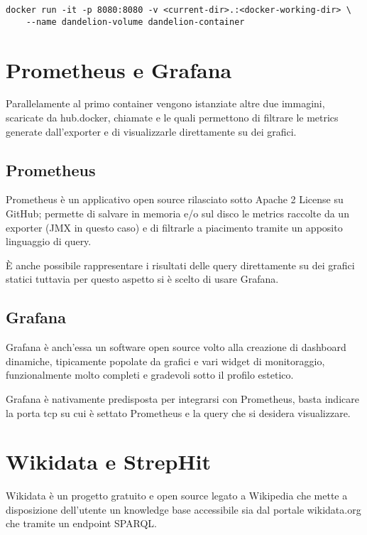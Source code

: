 \begin{lstlisting}[style=YmlStyle, caption=Run Docker]
    docker run -it -p 8080:8080 -v <current-dir>.:<docker-working-dir> \
    --name dandelion-volume dandelion-container
\end{lstlisting}

\section{Prometheus e Grafana}
Parallelamente al primo container vengono istanziate altre due immagini, scaricate da hub.docker\cite{hub-docker}, chiamate \cite{docker-prometheus} 
e \code{grafana/grafana}\cite{docker-grafana} le quali permettono di filtrare le metrics generate dall'exporter e di visualizzarle direttamente su dei grafici. 

\subsection{Prometheus}
Prometheus\cite{prometheus} è un applicativo open source rilasciato sotto Apache 2 License su GitHub; permette di salvare in memoria e/o sul disco le metrics raccolte 
da un exporter (JMX in questo caso) e di filtrarle a piacimento tramite un apposito linguaggio di query. 

È anche possibile rappresentare i risultati delle query direttamente su dei grafici statici tuttavia per questo aspetto si è scelto di usare Grafana.

\subsection{Grafana}
Grafana\cite{grafana} è anch'essa un software open source volto alla creazione di dashboard dinamiche, tipicamente popolate da grafici e vari widget di monitoraggio, 
funzionalmente molto completi e gradevoli sotto il profilo estetico. 

Grafana è nativamente predisposta per integrarsi con Prometheus, basta indicare la porta tcp su cui è settato Prometheus e la query che si desidera visualizzare.   

\section{Wikidata e StrepHit}
Wikidata è un progetto gratuito e open source legato a Wikipedia che mette a disposizione dell'utente un knowledge base accessibile sia dal portale wikidata.org che tramite un endpoint SPARQL.

